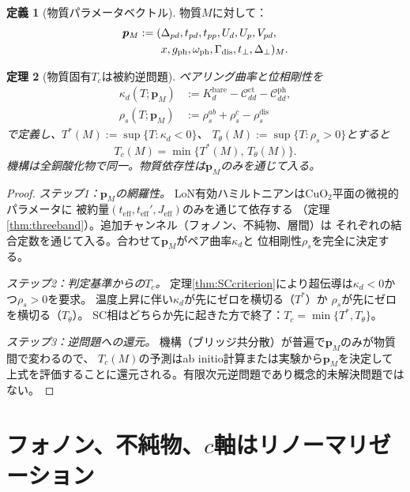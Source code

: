 \documentclass[12pt]{article}
\theoremstyle{plain}
\newtheorem{theorem}{定理}[section]
\theoremstyle{definition}
\newtheorem{definition}[theorem]{定義}
\numberwithin{equation}{section}
\newcommand{\eff}{\mathrm{eff}}
\begin{document}
\begin{definition}[物質パラメータベクトル]
物質$M$に対して：
\begin{align}
\bm{p}_M:=(&\Delta_{pd},t_{pd},t_{pp},U_d,U_p,V_{pd},\notag\\
&x,g_{\mathrm{ph}},\omega_{\mathrm{ph}},
\Gamma_{\mathrm{dis}},t_\perp,\Delta_\perp)_M.
\end{align}
\end{definition}

\begin{theorem}[物質固有$T_c$は被約逆問題]\label{thm:materialTc}
ペアリング曲率と位相剛性を
\begin{align}
\kappa_d(T;\bm{p}_M) &:= K_d^{\mathrm{bare}}
-\mathcal{C}_{dd}^{\mathrm{ct}}-\mathcal{C}_{dd}^{\mathrm{ph}},\\
\rho_s(T;\bm{p}_M) &:= \rho_s^{ab}+\rho_s^c-\rho_s^{\mathrm{dis}}
\end{align}
で定義し、$T^*(M):=\sup\{T:\kappa_d<0\}$、
$T_\theta(M):=\sup\{T:\rho_s>0\}$とすると
\begin{equation}
\boxed{T_c(M) = \min\{T^*(M),\,T_\theta(M)\}.}
\end{equation}
機構は全銅酸化物で同一。物質依存性は$\bm{p}_M$のみを通じて入る。
\end{theorem}

\begin{proof}
\emph{ステップ1：$\bm{p}_M$の網羅性。}
LoN有効ハミルトニアンはCuO$_2$平面の微視的パラメータに
被約量$(t_{\eff},t_{\eff}',J_{\eff})$のみを通じて依存する
（定理\ref{thm:threeband}）。追加チャンネル（フォノン、不純物、層間）は
それぞれの結合定数を通じて入る。合わせて$\bm{p}_M$がペア曲率$\kappa_d$と
位相剛性$\rho_s$を完全に決定する。

\emph{ステップ2：判定基準からの$T_c$。}
定理\ref{thm:SCcriterion}により超伝導は$\kappa_d<0$かつ$\rho_s>0$を要求。
温度上昇に伴い$\kappa_d$が先にゼロを横切る（$T^*$）か
$\rho_s$が先にゼロを横切る（$T_\theta$）。
SC相はどちらか先に起きた方で終了：$T_c=\min\{T^*,T_\theta\}$。

\emph{ステップ3：逆問題への還元。}
機構（ブリッジ共分散）が普遍で$\bm{p}_M$のみが物質間で変わるので、
$T_c(M)$の予測はab initio計算または実験から$\bm{p}_M$を決定して
上式を評価することに還元される。有限次元逆問題であり概念的未解決問題ではない。
\end{proof}


\part{フォノン、不純物、$c$軸はリノーマリゼーション}
\end{document}
